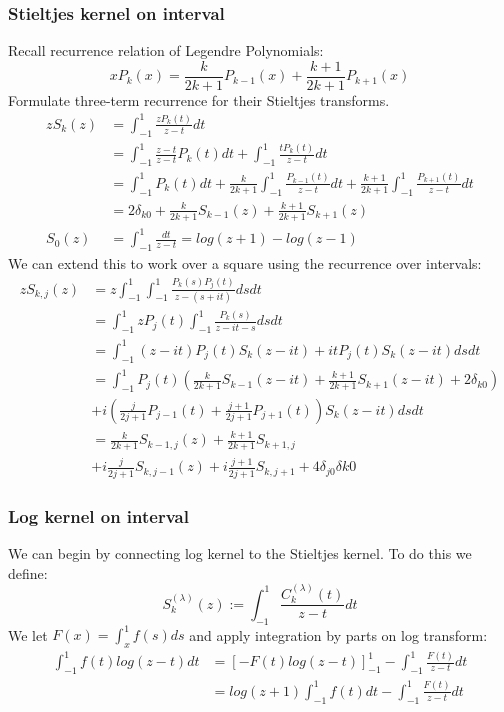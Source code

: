 \documentclass{article}
\begin{document}
\subsubsection{Stieltjes kernel on interval}
Recall recurrence relation of Legendre Polynomials:
\begin{equation}\label{legendre recurrence}
	xP_k(x) = \frac{k}{2k+1}P_{k-1}(x) + \frac{k+1}{2k+1}P_{k+1}(x)
\end{equation}
Formulate three-term recurrence for their Stieltjes transforms.
\begin{equation}
\begin{split}
	zS_k(z) &= \int_{-1}^{1}\frac{zP_k(t)}{z-t}dt \\
	&= \int_{-1}^{1}\frac{z-t}{z-t}P_k(t)dt+\int_{-1}^{1}\frac{tP_k(t)}{z-t}dt \\
	&= \int_{-1}^{1}P_k(t)dt+\frac{k}{2k+1}\int_{-1}^{1}\frac{P_{k-1}(t)}{z-t}dt+\frac{k+1}{2k+1}\int_{-1}^{1}\frac{P_{k+1}(t)}{z-t}dt \\
	&= 2\delta_{k0}+\frac{k}{2k+1}S_{k-1}(z)+\frac{k+1}{2k+1}S_{k+1}(z) \\
	S_0(z) &= \int_{-1}^{1}\frac{dt}{z-t} = log(z+1)-log(z-1)
\end{split}
\end{equation}
We can extend this to work over a square using the recurrence over intervals:
\begin{equation}
\begin{split}
zS_{k,j}(z) &= z\int_{-1}^1\int_{-1}^1\frac{P_k(s)P_j(t)}{z-(s+it)}dsdt \\
&= \int_{-1}^1zP_j(t)\int_{-1}^1\frac{P_k(s)}{z-it-s}dsdt \\
&= \int_{-1}^1(z-it)P_j(t)S_k(z-it)+itP_j(t)S_k(z-it)dsdt \\
&= \int_{-1}^1P_j(t)(\frac{k}{2k+1}S_{k-1}(z-it)+\frac{k+1}{2k+1}S_{k+1}(z-it)+2\delta_{k0}) \\
&+i(\frac{j}{2j+1}P_{j-1}(t)+\frac{j+1}{2j+1}P_{j+1}(t))S_k(z-it)dsdt \\
&= \frac{k}{2k+1}S_{k-1,j}(z)+\frac{k+1}{2k+1}S_{k+1,j} \\
&+i\frac{j}{2j+1}S_{k,j-1}(z)+i\frac{j+1}{2j+1}S_{k,j+1}+4\delta_{j0}\delta{k0}
\end{split}
\end{equation}
\subsubsection{Log kernel on interval}
We can begin by connecting log kernel to the Stieltjes kernel. To do this we define:$$S_k^{(\lambda)}(z):=\int_{-1}^{1}\frac{C_k^{(\lambda)}(t)}{z-t}dt$$
We let $F(x) = \int_x^1f(s)ds$ and apply integration by parts on log transform:
\begin{equation}
\begin{split}
	\int_{-1}^1f(t)log(z-t)dt &= [-F(t)log(z-t)]_{-1}^1-\int_{-1}^1\frac{F(t)}{z-t}dt \\
	&= log(z+1)\int_{-1}^1f(t)dt-\int_{-1}^1\frac{F(t)}{z-t}dt
\end{split}
\end{equation}
\end{document}
